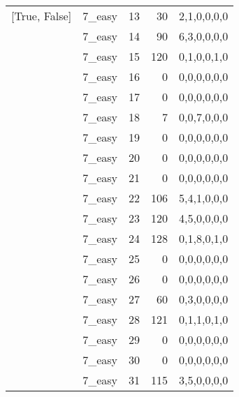 \begin{tabular}{llrrl}
 [True, False]   & 7\_easy              &            13 &                    30 & 2,1,0,0,0,0   \\
 [True, False]   & 7\_easy              &            14 &                    90 & 6,3,0,0,0,0   \\
 [True, False]   & 7\_easy              &            15 &                   120 & 0,1,0,0,1,0   \\
 [True, False]   & 7\_easy              &            16 &                     0 & 0,0,0,0,0,0   \\
 [True, False]   & 7\_easy              &            17 &                     0 & 0,0,0,0,0,0   \\
 [True, False]   & 7\_easy              &            18 &                     7 & 0,0,7,0,0,0   \\
 [True, False]   & 7\_easy              &            19 &                     0 & 0,0,0,0,0,0   \\
 [True, False]   & 7\_easy              &            20 &                     0 & 0,0,0,0,0,0   \\
 [True, False]   & 7\_easy              &            21 &                     0 & 0,0,0,0,0,0   \\
 [True, False]   & 7\_easy              &            22 &                   106 & 5,4,1,0,0,0   \\
 [True, False]   & 7\_easy              &            23 &                   120 & 4,5,0,0,0,0   \\
 [True, False]   & 7\_easy              &            24 &                   128 & 0,1,8,0,1,0   \\
 [True, False]   & 7\_easy              &            25 &                     0 & 0,0,0,0,0,0   \\
 [True, False]   & 7\_easy              &            26 &                     0 & 0,0,0,0,0,0   \\
 [True, False]   & 7\_easy              &            27 &                    60 & 0,3,0,0,0,0   \\
 [True, False]   & 7\_easy              &            28 &                   121 & 0,1,1,0,1,0   \\
 [True, False]   & 7\_easy              &            29 &                     0 & 0,0,0,0,0,0   \\
 [True, False]   & 7\_easy              &            30 &                     0 & 0,0,0,0,0,0   \\
 [True, False]   & 7\_easy              &            31 &                   115 & 3,5,0,0,0,0   \\

\end{tabular}

